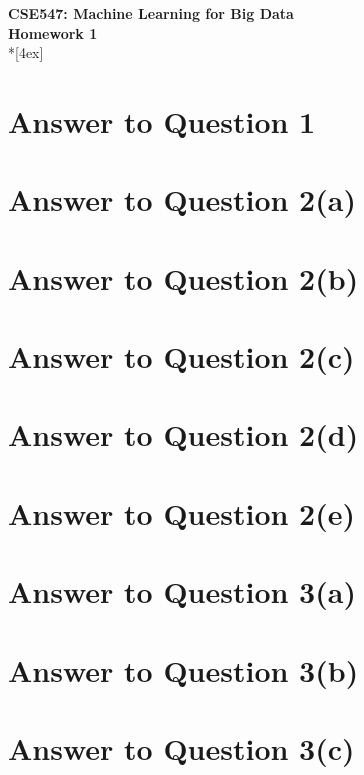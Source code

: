 \documentclass[11pt]{article}
\begin{document}
\thispagestyle{empty}
\parindent 0pt
\vfill
\large

\begin{center}
\LARGE{\bf \textsf{CSE547: Machine Learning for Big Data}}\\ {\bf \textsf{Homework 1}} 
\\*[4ex]
\end{center}

\section*{Answer to Question 1}

\pagebreak[4]
\section*{Answer to Question 2(a)}

\pagebreak[4]
\section*{Answer to Question 2(b)}

\pagebreak[4]
\section*{Answer to Question 2(c)}

\pagebreak[4]
\section*{Answer to Question 2(d)}

\pagebreak[4]
\section*{Answer to Question 2(e)}

\pagebreak[4]
\section*{Answer to Question 3(a)}

\pagebreak[4]
\section*{Answer to Question 3(b)}

\pagebreak[4]
\section*{Answer to Question 3(c)}
\end{document}
